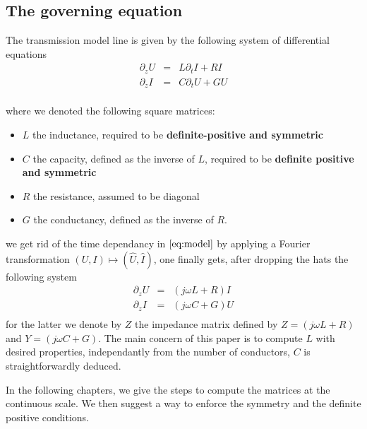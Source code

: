 \renewcommand{\vec}[1]{\ensuremath{\mathbf #1}}

\subsection*{The governing equation}
The transmission model line is given by the following system of differential equations
\begin{equation}
  \label{eq:model}
    \begin{array}{ccc}
      \partial_z U&=& L\partial_t I + RI \\
      \partial_z I&=& C\partial_t U + GU \\
    \end{array}
\end{equation}

where we denoted the following square matrices:
\begin{itemize}
\item  $L$ the inductance, required to be \textbf{definite-positive and symmetric}
\item $C$ the capacity, defined as the inverse of $L$, required to be \textbf{definite positive and symmetric}
\item $R$ the resistance, assumed to be diagonal
\item $G$ the conductancy, defined as the inverse of $R$.
\end{itemize}

we get rid  of the time dependancy in $\eqref{eq:model}$ by applying a Fourier transformation $(U,I) \mapsto (\hat{U},\hat{I})$, one finally gets, after dropping the hats the following system
\begin{equation}
  \label{eq:model.fourier}
    \begin{array}{ccc}
      \partial_z U &=& (j\omega L + R) I \\
      \partial_z I &=& (j\omega C  + G) U \\  
    \end{array}
\end{equation}
for the latter we denote by $Z$ the impedance matrix defined by $Z=(j\omega L + R)$ and $Y=(j\omega C  + G)$. The main concern of this paper is to compute $L$ with desired properties, independantly  from the number of conductors, $C$ is straightforwardly deduced.

In the following chapters, we give the steps to compute the matrices at the continuous scale. We then suggest a way to enforce the symmetry and the definite positive conditions.
